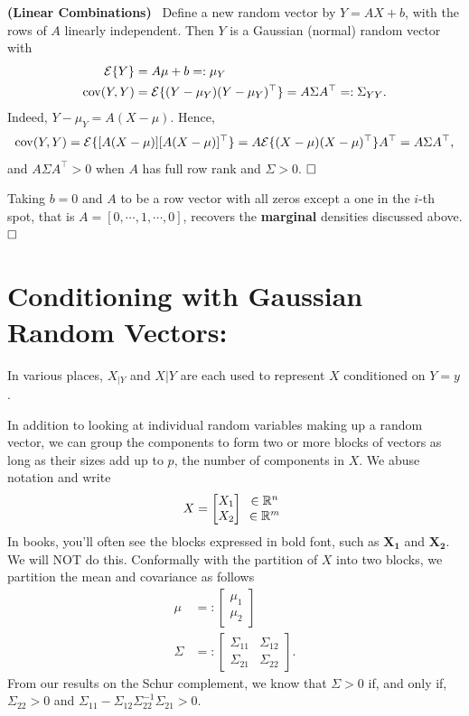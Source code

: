 \begin{fact}
\label{fact:GaussianLinearCombinations}
\textbf{(Linear Combinations)}~ Define a new random vector by $Y=A X + b$, with the rows of $A$ linearly independent. Then $Y$ is a Gaussian (normal) random vector with
\begin{align*}
   \mathcal{E}\{ Y\} &= A \mu + b=:\mu_Y\\
\mathrm{cov}(Y,Y)&=\mathcal{E}\{ (Y-\mu_Y) (Y-\mu_Y)^\top \} =A \Sigma A^\top =: \Sigma_{YY}.
\end{align*}
Indeed, $Y-\mu_Y = A(X-\mu)$. Hence,
$$\mathrm{cov}(Y,Y)=\mathcal{E}\{ [A(X-\mu)] [A(X-\mu)]^\top \} =A \mathcal{E}\{ (X-\mu) (X-\mu)^\top \}A^\top=A \Sigma A^\top,$$
and $A \Sigma A^\top >0$ when $A$ has full row rank and $\Sigma>0$.
$\hfill \square$  \end{fact}

\begin{rem}
       Taking $b=0$ and $A$ to be a row vector with all zeros except a one in the $i$-th spot, that is $A=[0, \cdots, 1, \cdots, 0]$, recovers the \textbf{marginal} densities discussed above.
$\hfill \square$  \end{rem} 

\section{Conditioning with Gaussian Random Vectors:}

\begin{rem} In various places,  $X_{|Y}$ and $X|Y$ are each used to represent $X$ conditioned on $Y=y$. 
\end{rem}

In addition to looking at individual random variables making up a random vector, we can group the components to form two or more blocks of vectors as long as their sizes add up to $p$, the number of components in $X$. We abuse notation and write
$$X = \begin{bmatrix} X_1 \\ X_2 \end{bmatrix} \begin{array}{c} \in \mathbb R^{n} \\ \in \mathbb R^{m} \end{array}$$
In books, you'll often see the blocks expressed in bold font, such as $\mathbf{X_1}$ and $\mathbf{X_2}$. We will NOT do this. Conformally with the partition of $X$ into two blocks, we partition the mean and covariance as follows
\begin{align*}
\mu &=: \begin{bmatrix} \mu_1 \\ \mu_2 \end{bmatrix}\\
 \Sigma &=: \left[ \begin{array}{cc} \Sigma_{11} & \Sigma_{12} \\ \Sigma_{21} & \Sigma_{22} \end{array}  \right].
\end{align*}
From our results on the Schur complement, we know that $\Sigma>0$ if, and only if, $\Sigma_{22}>0$ and $ \Sigma_{11}-\Sigma_{12} \Sigma_{22}^{-1}\Sigma_{21}>0$.

